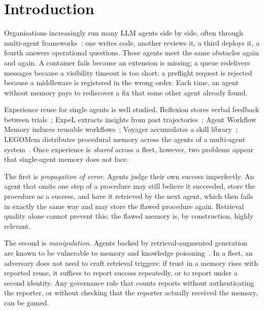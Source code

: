 \documentclass[5p,times,twocolumn]{elsarticle}
\begin{document}
\section{Introduction}
\label{sec:intro}

Organisations increasingly run many LLM agents side by side, often through multi-agent frameworks~\cite{hong2024metagpt,wu2023autogen}: one writes code, another reviews it, a third deploys it, a fourth answers operational questions. These agents meet the same obstacles again and again. A container fails because an extension is missing; a queue redelivers messages because a visibility timeout is too short; a preflight request is rejected because a middleware is registered in the wrong order. Each time, an agent without memory pays to rediscover a fix that some other agent already found.

Experience reuse for single agents is well studied. Reflexion stores verbal feedback between trials~\cite{shinn2023reflexion}; ExpeL extracts insights from past trajectories~\cite{zhao2024expel}; Agent Workflow Memory induces reusable workflows~\cite{wang2024awm}; Voyager accumulates a skill library~\cite{wang2024voyager}; LEGOMem distributes procedural memory across the agents of a multi-agent system~\cite{han2025legomem}. Once experience is \emph{shared} across a fleet, however, two problems appear that single-agent memory does not face.

The first is \emph{propagation of error}. Agents judge their own success imperfectly. An agent that omits one step of a procedure may still believe it succeeded, store the procedure as a success, and have it retrieved by the next agent, which then fails in exactly the same way and may store the flawed procedure again. Retrieval quality alone cannot prevent this: the flawed memory is, by construction, highly relevant.

The second is \emph{manipulation}. Agents backed by retrieval-augmented generation~\cite{lewis2020rag} are known to be vulnerable to memory and knowledge poisoning~\cite{chen2024agentpoison,zou2025poisonedrag,dong2025minja}. In a fleet, an adversary does not need to craft retrieval triggers: if trust in a memory rises with reported reuse, it suffices to report success repeatedly, or to report under a second identity. Any governance rule that counts reports without authenticating the reporter, or without checking that the reporter actually received the memory, can be gamed.
\end{document}
